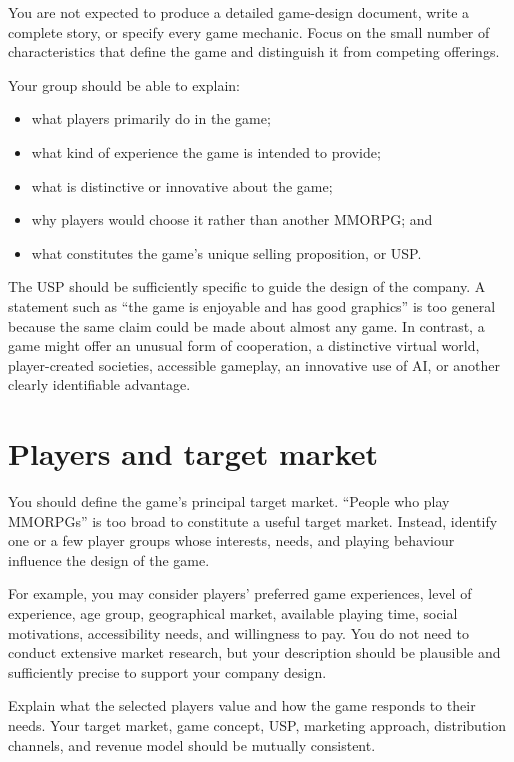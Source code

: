 \documentclass[12pt,a4paper]{article}
\begin{document}
You are not expected to produce a detailed game-design document, write a complete story, or specify every game mechanic. Focus on
the small number of characteristics that define the game and distinguish it from competing offerings.

Your group should be able to explain:

\begin{itemize}
  \item what players primarily do in the game;
  \item what kind of experience the game is intended to provide;
  \item what is distinctive or innovative about the game;
  \item why players would choose it rather than another MMORPG; and
  \item what constitutes the game's unique selling proposition, or USP.
\end{itemize}

The USP should be sufficiently specific to guide the design of the company. A statement such as \enquote{the game is enjoyable and
has good graphics} is too general because the same claim could be made about almost any game. In contrast, a game might offer an
unusual form of cooperation, a distinctive virtual world, player-created societies, accessible gameplay, an innovative use of AI,
or another clearly identifiable advantage.

\section*{Players and target market}

You should define the game's principal target market. \enquote{People who play MMORPGs} is too broad to constitute a useful target
market. Instead, identify one or a few player groups whose interests, needs, and playing behaviour influence the design of the game.

For example, you may consider players' preferred game experiences, level of experience, age group, geographical market, available
playing time, social motivations, accessibility needs, and willingness to pay. You do not need to conduct extensive market research,
but your description should be plausible and sufficiently precise to support your company design.

Explain what the selected players value and how the game responds to their needs. Your target market, game concept, USP, marketing
approach, distribution channels, and revenue model should be mutually consistent.
\end{document}
